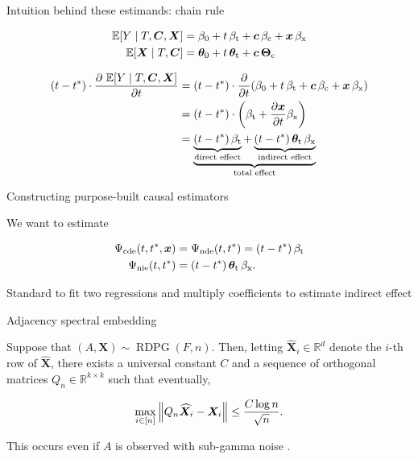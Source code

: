 \documentclass{beamer}
\theoremstyle{remark}
\renewcommand{\c}{\bm c}
\newcommand{\x}{\bm x}
\newcommand{\C}{\bm C}
\newcommand{\X}{\bm X}
\newcommand{\Xhat}{\widehat{\X}}
\newcommand \R {\mathbb{R}}
\newcommand{\thetazero}{\bm \theta_0}
\newcommand{\thetat}{\bm \theta_\text{t}}
\newcommand{\Thetac}{\bm \Theta_\text{c}}
\newcommand{\betazero}{\beta_0}
\newcommand{\betat}{\beta_\text{t}}
\newcommand{\betac}{\beta_\text{c}}
\newcommand{\betax}{\beta_\text{x}}
\newcommand{\cde}{\Psi_\text{cde} \paren*{t, t^*, \x}}
\newcommand{\nde}{\Psi_\text{nde} \paren*{t, t^*}}
\newcommand{\nie}{\Psi_\text{nie} \paren*{t, t^*}}
\newcommand{\RDPG}{\operatorname{RDPG}}
\newcommand \dist {\sim}
\DeclarePairedDelimiter{\paren}{(}{)}
\DeclarePairedDelimiter{\brac}{[}{]}
\DeclarePairedDelimiter{\norm}{\lVert}{\rVert}
\newcommand{\E}[2][]{%
   \ifthenelse{ \equal{#1}{} }
      {\ensuremath{\mathbb{E} \brac*{#2}}}
      {\ensuremath{\mathbb{E} \brac*{#2 \mid #1}}}
}
\begin{document}
\begin{frame}{Intuition behind these estimands: chain rule}

    \begin{align*}
        \E[T, \C, \X]{Y}
         & = \betazero
        + t \, \betat
        + \c \, \betac
        + \x \, \betax  \\
        \E[T, \C]{\X}
         & = \thetazero
        + t \, \thetat
        + \c \, \Thetac
    \end{align*}

    \begin{align*}
        \paren*{t - t^*}  \cdot \frac{\partial \ \E[T, \C, \X]{Y}}{\partial t}
         & = \paren*{t - t^*}  \cdot \frac{\partial}{\partial t} \paren*{\betazero + t \, \betat + \c \, \betac + \x \, \betax } \\
         & = \paren*{t - t^*}  \cdot \paren*{\betat + \frac{\partial \x}{\partial t} \betax}                                     \\
         & =
        \underbrace{
            \underbrace{\paren*{t - t^*} \, \betat}_\text{direct effect} + \underbrace{\paren*{t - t^*} \, \thetat \, \betax}_\text{indirect effect}
        }_\text{total effect}
    \end{align*}

\end{frame}

\begin{frame}{Constructing purpose-built causal estimators}

    We want to estimate

    \begin{align*}
        \cde & = \nde = \paren*{t - t^*} \, \betat      \\
        \nie & = \paren*{t - t^*} \, \thetat \, \betax.
    \end{align*}

    Standard to fit two regressions and multiply coefficients to estimate indirect effect \citep{vanderweele_mediation_2014}

\end{frame}

\begin{frame}{Adjacency spectral embedding}

    \begin{lemma}
        \label{lem:2toinfty}

        Suppose that $(A, \X) \dist \RDPG(F,n)$. Then, letting $\Xhat_i \in \R^d$ denote the $i$-th row of $\Xhat$, there exists a universal constant $C$ and a sequence of orthogonal matrices $Q_n \in \R^{k \times k}$ such that eventually,

        \begin{equation*}
            \max_{i \in [n]} \, \norm*{Q_n \Xhat_i - \X_i} \le \frac{C \log n}{\sqrt n}.
        \end{equation*}

        This occurs even if $A$ is observed with sub-gamma noise \citep{levin_recovering_2022}.

    \end{lemma}
\end{frame}
\end{document}
